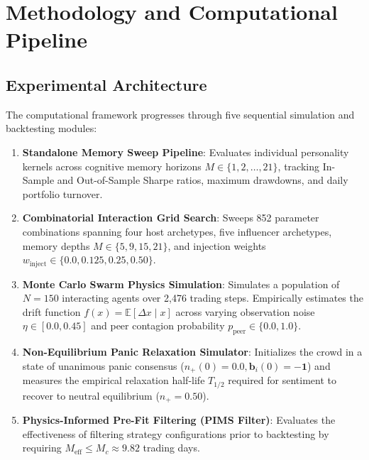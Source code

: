 \section{Methodology and Computational Pipeline}

\subsection{Experimental Architecture}
The computational framework progresses through five sequential simulation and backtesting modules:

\begin{enumerate}
    \item \textbf{Standalone Memory Sweep Pipeline}: Evaluates individual personality kernels across cognitive memory horizons $M \in \{1, 2, \dots, 21\}$, tracking In-Sample and Out-of-Sample Sharpe ratios, maximum drawdowns, and daily portfolio turnover.
    \item \textbf{Combinatorial Interaction Grid Search}: Sweeps 852 parameter combinations spanning four host archetypes, five influencer archetypes, memory depths $M \in \{5, 9, 15, 21\}$, and injection weights $w_{\text{inject}} \in \{0.0, 0.125, 0.25, 0.50\}$.
    \item \textbf{Monte Carlo Swarm Physics Simulation}: Simulates a population of $N=150$ interacting agents over 2,476 trading steps. Empirically estimates the drift function $f(x) = \mathbb{E}[\Delta x \mid x]$ across varying observation noise $\eta \in [0.0, 0.45]$ and peer contagion probability $p_{\text{peer}} \in \{0.0, 1.0\}$.
    \item \textbf{Non-Equilibrium Panic Relaxation Simulator}: Initializes the crowd in a state of unanimous panic consensus ($n_+(0) = 0.0, \mathbf{b}_i(0) = -\mathbf{1}$) and measures the empirical relaxation half-life $T_{1/2}$ required for sentiment to recover to neutral equilibrium ($n_+ = 0.50$).
    \item \textbf{Physics-Informed Pre-Fit Filtering (PIMS Filter)}: Evaluates the effectiveness of filtering strategy configurations prior to backtesting by requiring $M_{\text{eff}} \le M_c \approx 9.82$ trading days.
\end{enumerate}

